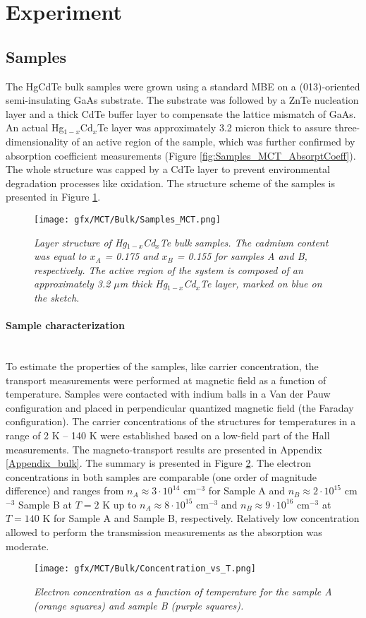 \documentclass[titlepage,a4paper]{book}
\newcommand{\wciecie}{\quad\phantom{v}}
\newcommand{\myparagraph}[1]{\paragraph{#1}\mbox{}\\}
\begin{document}
\section{Experiment}
\subsection{Samples}
\wciecie
The HgCdTe bulk samples were grown using a standard MBE on a (013)-oriented semi-insulating GaAs substrate. The substrate was followed by a ZnTe nucleation layer and a thick CdTe buffer layer to compensate the lattice mismatch of GaAs. An actual Hg$_{1-x}$Cd$_x$Te layer was approximately 3.2 micron thick to assure three-dimensionality of an active region of the sample, which was further confirmed by absorption coefficient measurements (Figure \ref{fig:Samples_MCT_AbsorptCoeff}). The whole structure was capped by a CdTe layer to prevent environmental degradation processes like oxidation. The structure scheme of the samples is presented in Figure \ref{fig:Samples_MCT}. 

\begin{figure}[ht]
	\centering
	\texttt{[image: gfx/MCT/Bulk/Samples\_MCT.png]}
	\vspace{-10pt}
	\caption{\textit{Layer structure of Hg$_{1-x}$Cd$_x$Te bulk samples. The cadmium content was equal to $x_A$ = 0.175 and $x_B$ = 0.155 for samples A and B, respectively. The active region of the system is composed of an approximately 3.2 $\mu$m thick Hg$_{1-x}$Cd$_x$Te layer, marked on blue on the sketch.}}
	\label{fig:Samples_MCT}
\end{figure} 

\myparagraph{Sample characterization}
\wciecie
To estimate the properties of the samples, like carrier concentration, the transport measurements were performed at magnetic field as a function of temperature. Samples were contacted with indium balls in a Van der Pauw configuration and placed in perpendicular quantized magnetic field (the Faraday configuration). The carrier concentrations of the structures for temperatures in a range of 2 K -- 140 K were established based on a low-field part of the Hall measurements. The magneto-transport results are presented in Appendix \ref{Appendix_bulk}. The summary is presented in Figure \ref{fig:Samples_MCT_Transport}. The electron concentrations in both samples are comparable (one order of magnitude difference) and ranges from $n_A \approx 3 \cdot 10^{14}$ cm$^{-3}$ for Sample A and $n_B \approx 2 \cdot 10^{15}$ cm$^{-3}$ Sample B at $T = 2$ K up to $n_A \approx 8 \cdot 10^{15}$ cm$^{-3}$ and $n_B \approx 9 \cdot 10^{16}$ cm$^{-3}$ at $T = 140$ K for Sample A and Sample B, respectively. Relatively low concentration allowed to perform the transmission measurements as the absorption was moderate. 
\begin{figure}[ht]
	\centering
	\texttt{[image: gfx/MCT/Bulk/Concentration\_vs\_T.png]}
	\vspace{-10pt}
	\caption{\textit{Electron concentration as a function of temperature for the sample A (orange squares) and sample B (purple squares).}}
	\label{fig:Samples_MCT_Transport}
\end{figure} 
\end{document}
